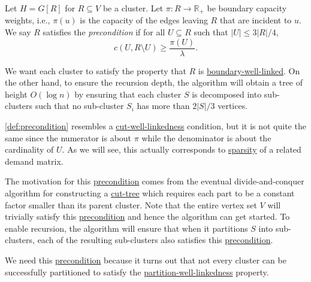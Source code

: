 \begin{definition}[Precondition]\label{def:precondition}
	Let \(H= G[R]\) for \(R \subseteq V\) be a cluster. Let \(\pi \colon R \to \mathbb{R} _+\) be boundary capacity weights, i.e., \(\pi (u)\) is the capacity of the edges leaving \(R\) that are incident to \(u\). We say \(R\) satisfies the \emph{precondition} if for all \(U \subseteq R\) such that \(\lvert U \rvert \leq 3 \lvert R \rvert / 4\),
	\[
		c(U, R \setminus U)
		\geq \frac{\pi (U)}{\lambda }.
	\]
\end{definition}

\begin{intuition}
	We want each cluster to satisfy the property that \(R\) is \hyperref[def:boundary-well-linked]{boundary-well-linked}. On the other hand, to ensure the recursion depth, the algorithm will obtain a tree of height \(O(\log n)\) by ensuring that each cluster \(S\) is decomposed into sub-clusters such that no sub-cluster \(S_i\) has more than \(2 \lvert S \rvert / 3\) vertices.
\end{intuition}

\autoref{def:precondition} resembles a \hyperref[def:cut-well-linked]{cut-well-linkedness} condition, but it is not quite the same since the numerator is about \(\pi \) while the denominator is about the cardinality of \(U\). As we will see, this actually corresponds to \hyperref[def:sparsity]{sparsity} of a related demand matrix.

The motivation for this \hyperref[def:precondition]{precondition} comes from the eventual divide-and-conquer algorithm for constructing a \hyperref[def:cut-tree]{cut-tree} which requires each part to be a constant factor smaller than its parent cluster. Note that the entire vertex set \(V\) will trivially satisfy this \hyperref[def:precondition]{precondition} and hence the algorithm can get started. To enable recursion, the algorithm will ensure that when it partitions \(S\) into sub-clusters, each of the resulting sub-clusters also satisfies this \hyperref[def:precondition]{precondition}.

\begin{intuition}
	We need this \hyperref[def:precondition]{precondition} because it turns out that not every cluster can be successfully partitioned to satisfy the \hyperref[def:partition-and-boundary-well-linked]{partition-well-linkedness} property.
\end{intuition}

